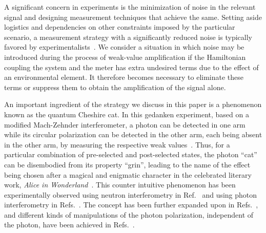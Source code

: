 \documentclass[aps,pra,showpacs,twoside,twocolumn,10pt]{revtex4-1}
\begin{document}
A significant concern in  experiments is the minimization of noise in the relevant signal and designing measurement techniques that achieve the same. Setting aside logistics and dependencies on other constraints imposed by the particular scenario, a measurement strategy with 
a significantly reduced noise is typically  favored by experimentalists~\cite{SNR1, SNR2, SNR3, SNR4, SNR5, SNR6}. We consider a situation in which noise may be introduced during the process of weak-value amplification if the Hamiltonian coupling the system and the meter 
has extra undesired terms due to the effect of an environmental element. It therefore becomes  necessary to eliminate these terms or suppress them to obtain the amplification of the signal alone. 

An important ingredient of the strategy we discuss in this paper is a phenomenon known as the quantum Cheshire cat. In this gedanken experiment, based on a modified Mach-Zehnder interferometer, a photon can be detected in one arm while its circular polarization can be detected in the other arm, each being absent in the other arm, by measuring the respective weak values~\cite{Aharonov}. Thus, for a particular combination of pre-selected and post-selected states, the photon ``cat'' can be disembodied from its property ``grin'', leading to the name of the effect being chosen after a magical and enigmatic character in the celebrated literary work, \textit{Alice in Wonderland}~\cite{Alice}.
This counter intuitive phenomenon has been experimentally observed using neutron interferometry in Ref.~\cite{Denkmayr} and using photon interferometry in Refs.~\cite{Correa, Sponar, Ashby, Kim2021}. The concept has been further expanded upon in Refs.~\cite{Bancal, At, Duprey, dynamic}, and different kinds of manipulations of the photon polarization, independent of the photon, have been achieved in Refs.~\cite{DasPati, Liu2020, DasSen, wavepar}.
\end{document}
